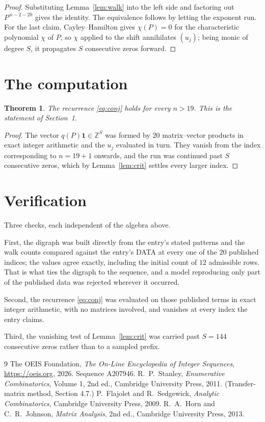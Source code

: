 \documentclass[11pt,a4paper]{article}
\theoremstyle{plain}
\newtheorem{theorem}{Theorem}
\theoremstyle{definition}
\begin{document}
\begin{proof}
Substituting Lemma~\ref{lem:walk} into the left side and factoring out
$P^{\,n-2-20}$ gives the identity. The equivalence follows by letting the exponent
run. For the last claim, Cayley--Hamilton gives $\chi(P)=0$ for the characteristic
polynomial $\chi$ of $P$, so $\chi$ applied to the shift annihilates $(u_j)$; being monic of
degree $S$, it propagates $S$ consecutive zeros forward.
\end{proof}

\section{The computation}

\begin{theorem}
The recurrence \eqref{eq:conj} holds for every $n>19$. This is the statement of
Section~1.
\end{theorem}

\begin{proof}
The vector $q(P)\mathbf{1}\in\mathbb{Z}^{S}$ was formed by $20$ matrix--vector
products in exact integer arithmetic and the $u_j$ evaluated in turn. They vanish from the
index corresponding to $n=19+1$ onwards, and the run was continued past $S$ consecutive
zeros, which by Lemma~\ref{lem:crit} settles every larger index.
\end{proof}

\section{Verification}

Three checks, each independent of the algebra above.

First, the digraph was built directly from the entry's stated patterns and the walk counts
compared against the entry's DATA at every one of the $20$ published indices; the
values agree exactly, including the initial count of $12$ admissible rows. That is
what ties the digraph to the sequence, and a model reproducing only part of the published
data was rejected wherever it occurred.

Second, the recurrence \eqref{eq:conj} was evaluated on those published terms in exact
integer arithmetic, with no matrices involved, and vanishes at every index the entry claims.

Third, the vanishing test of Lemma~\ref{lem:crit} was carried past $S=144$ consecutive
zeros rather than to a sampled prefix.

\begin{thebibliography}{9}
 The OEIS Foundation, \emph{The On-Line Encyclopedia of Integer
Sequences}, \url{https://oeis.org}, 2026. Sequence A207946.
 R.~P.~Stanley, \emph{Enumerative Combinatorics}, Volume 1, 2nd ed.,
Cambridge University Press, 2011. (Transfer-matrix method, Section 4.7.)
 P.~Flajolet and R.~Sedgewick, \emph{Analytic Combinatorics}, Cambridge
University Press, 2009.
 R.~A.~Horn and C.~R.~Johnson, \emph{Matrix Analysis}, 2nd ed., Cambridge
University Press, 2013.
\end{thebibliography}
\end{document}
